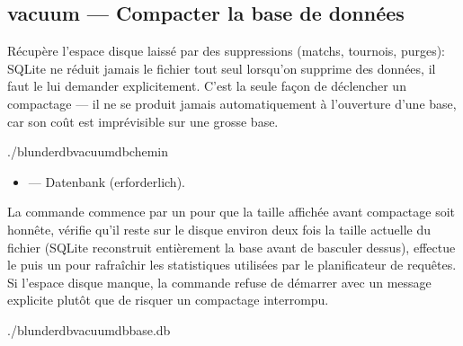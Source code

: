 \documentclass[letterpaper,10pt,german]{sphinxmanual}
\begin{document}
\subsection{vacuum — Compacter la base de données}
\label{\detokenize{cli:vacuum-compacter-la-base-de-donnees}}
\sphinxAtStartPar
Récupère l’espace disque laissé par des suppressions (matchs, tournois,
purges): SQLite ne réduit jamais le fichier tout seul lorsqu’on supprime des
données, il faut le lui demander explicitement. C’est la seule façon de
déclencher un compactage — il ne se produit jamais automatiquement à
l’ouverture d’une base, car son coût est imprévisible sur une grosse base.

\begin{sphinxVerbatim}[commandchars=\\\{\}]
./blunderdbvacuum\PYGZhy{}\PYGZhy{}db\PYGZlt{}chemin\PYGZgt{}
\end{sphinxVerbatim}

\sphinxAtStartPar
{}
\begin{itemize}
\item {} 
\sphinxAtStartPar
{} — Datenbank (erforderlich).

\end{itemize}

\sphinxAtStartPar
La commande commence par un  pour que la taille
affichée avant compactage soit honnête, vérifie qu’il reste sur le disque
environ deux fois la taille actuelle du fichier (SQLite reconstruit
entièrement la base avant de basculer dessus), effectue le  puis un
 pour rafraîchir les statistiques utilisées par le planificateur de
requêtes. Si l’espace disque manque, la commande refuse de démarrer avec un
message explicite plutôt que de risquer un compactage interrompu.

\sphinxAtStartPar
{}

\begin{sphinxVerbatim}[commandchars=\\\{\}]
./blunderdbvacuum\PYGZhy{}\PYGZhy{}dbbase.db

\end{sphinxVerbatim}
\end{document}

